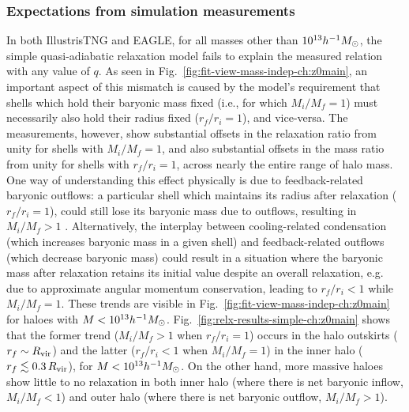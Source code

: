\subsubsection{Expectations from simulation measurements}
\label{subsubsec:sim-relax-ch:z0main}
In both IllustrisTNG and EAGLE, for all masses other than $10^{13} h^{-1}M_{\odot}$, the simple quasi-adiabatic relaxation model  fails to explain the measured relation with any value of $q$. 
As seen in Fig.~\ref{fig:fit-view-mass-indep-ch:z0main}, an important aspect of this mismatch is caused by the model's requirement that shells which hold their baryonic mass fixed (i.e., for which $M_i/M_f=1$) must necessarily also hold their radius fixed ($r_f/r_i=1$), and vice-versa. The measurements, however, show substantial offsets in the relaxation ratio from unity for shells with $M_i/M_f = 1$, and also substantial offsets in the mass ratio from unity for shells with $r_f/r_i=1$, across nearly the entire range of halo mass. One way of understanding this effect physically is due to feedback-related baryonic outflows: a particular shell which maintains its radius after relaxation ($r_f/r_i=1$), could still lose its baryonic mass due to outflows, resulting in $M_i/M_f > 1$ \citep[][]{2022MNRAS.511.3910F}. Alternatively, the interplay between cooling-related condensation (which increases baryonic mass in a given shell) and feedback-related outflows (which decrease baryonic mass) could result in a situation where the baryonic mass after relaxation retains its initial value despite an overall relaxation, e.g. due to approximate angular momentum conservation, leading to $r_f/r_i < 1$ while $M_i/M_f=1$. These trends are visible  in  Fig.~\ref{fig:fit-view-mass-indep-ch:z0main}  for haloes with $M<10^{13}h^{-1}M_{\odot}$. Fig.~\ref{fig:relx-results-simple-ch:z0main} shows that the former trend ($M_i/M_f > 1$ when $r_f/r_i=1$) occurs in the halo outskirts ($r_f\sim R_{\rm vir}$) and the latter ($r_f/r_i < 1$ when $M_i/M_f=1$) in the inner halo ($r_f\lesssim0.3\,R_{\rm vir}$), for $M<10^{13}h^{-1}M_{\odot}$. 
On the other hand, more massive haloes show little to no relaxation in both inner halo (where there is net baryonic inflow, $M_i/M_f < 1$) and outer halo (where there is net baryonic outflow, $M_i/M_f > 1$).

